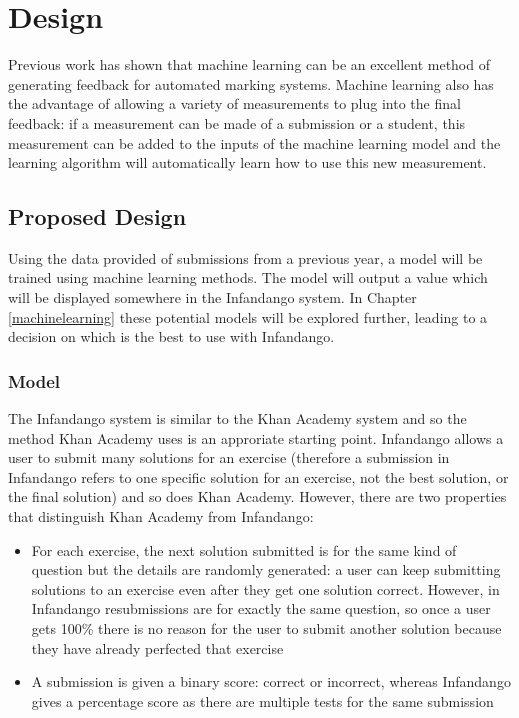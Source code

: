 \chapter{Design}
\label{design}
Previous work\cite{khan_blog}\cite{simstudent} has shown that machine learning can be an excellent method of generating feedback for automated marking systems. Machine learning also has the advantage of allowing a variety of measurements to plug into the final feedback: if a measurement can be made of a submission or a student, this measurement can be added to the inputs of the machine learning model and the learning algorithm will automatically learn how to use this new measurement.

\section{Proposed Design}
Using the data provided of submissions from a previous year, a model will be trained using machine learning methods. The model will output a value which will be displayed somewhere in the Infandango system. In Chapter \ref{machinelearning} these potential models will be explored further, leading to a decision on which is the best to use with Infandango.
\subsection{Model}
The Infandango system is similar to the Khan Academy system and so the method Khan Academy uses is an approriate starting point. Infandango allows a user to submit many solutions for an exercise (therefore a submission in Infandango refers to one specific solution for an exercise, not the best solution, or the final solution) and so does Khan Academy. However, there are two properties that distinguish Khan Academy from Infandango:

\begin{itemize}
\item For each exercise, the next solution submitted is for the same kind of question but the details are randomly generated: a user can keep submitting solutions to an exercise even after they get one solution correct. However, in Infandango resubmissions are for exactly the same question, so once a user gets 100\% there is no reason for the user to submit another solution because they have already perfected that exercise
\item A submission is given a binary score: correct or incorrect, whereas Infandango gives a percentage score as there are multiple tests for the same submission
\end{itemize}

